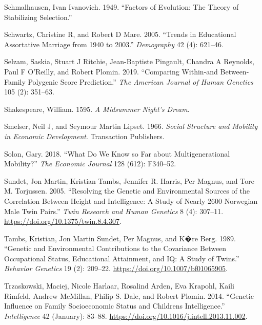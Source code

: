 \documentclass[
]{article}
\newlength{\cslhangindent}
\newlength{\cslentryspacingunit} %
\newenvironment{CSLReferences}[2] %
 {%
  \setlength{\parindent}{0pt}
  \ifodd #1
  \let\oldpar\par
  \def\par{\hangindent=\cslhangindent\oldpar}
  \fi
  \setlength{\parskip}{#2\cslentryspacingunit}
 }%
 {}
\theoremstyle{definition}
\theoremstyle{definition}
\theoremstyle{definition}
\theoremstyle{definition}
\theoremstyle{remark}
\begin{document}
\begin{CSLReferences}{1}{0}
\leavevmode{}%
Schmalhausen, Ivan Ivanovich. 1949. {``Factors of Evolution: The Theory of Stabilizing Selection.''}

\leavevmode{}%
Schwartz, Christine R, and Robert D Mare. 2005. {``Trends in Educational Assortative Marriage from 1940 to 2003.''} \emph{Demography} 42 (4): 621--46.

\leavevmode{}%
Selzam, Saskia, Stuart J Ritchie, Jean-Baptiste Pingault, Chandra A Reynolds, Paul F O'Reilly, and Robert Plomin. 2019. {``Comparing Within-and Between-Family Polygenic Score Prediction.''} \emph{The American Journal of Human Genetics} 105 (2): 351--63.

\leavevmode{}%
Shakespeare, William. 1595. \emph{A Midsummer Night's Dream}.

\leavevmode{}%
Smelser, Neil J, and Seymour Martin Lipset. 1966. \emph{Social Structure and Mobility in Economic Development}. Transaction Publishers.

\leavevmode{}%
Solon, Gary. 2018. {``What Do We Know so Far about Multigenerational Mobility?''} \emph{The Economic Journal} 128 (612): F340--52.

\leavevmode{}%
Sundet, Jon Martin, Kristian Tambs, Jennifer R. Harris, Per Magnus, and Tore M. Torjussen. 2005. {``Resolving the Genetic and Environmental Sources of the Correlation Between Height and Intelligence: A Study of Nearly 2600 Norwegian Male Twin Pairs.''} \emph{Twin Research and Human Genetics} 8 (4): 307--11. \url{https://doi.org/10.1375/twin.8.4.307}.

\leavevmode{}%
Tambs, Kristian, Jon Martin Sundet, Per Magnus, and K�re Berg. 1989. {``Genetic and Environmental Contributions to the Covariance Between Occupational Status, Educational Attainment, and {IQ}: A Study of Twins.''} \emph{Behavior Genetics} 19 (2): 209--22. \url{https://doi.org/10.1007/bf01065905}.

\leavevmode{}%
Trzaskowski, Maciej, Nicole Harlaar, Rosalind Arden, Eva Krapohl, Kaili Rimfeld, Andrew McMillan, Philip S. Dale, and Robert Plomin. 2014. {``Genetic Influence on Family Socioeconomic Status and Children{\textquotesingle}s Intelligence.''} \emph{Intelligence} 42 (January): 83--88. \url{https://doi.org/10.1016/j.intell.2013.11.002}.


\end{CSLReferences}
\end{document}
